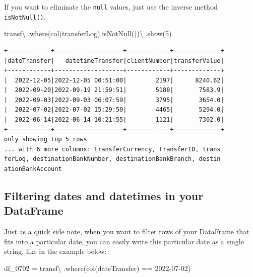 \documentclass[
  11pt,
  letterpaper,
  DIV=11,
  numbers=noendperiod]{scrreprt}
\newenvironment{Shaded}{\begin{snugshade}}{\end{snugshade}}
\newcommand{\DecValTok}[1]{\textcolor[rgb]{0.68,0.00,0.00}{#1}}
\newcommand{\NormalTok}[1]{\textcolor[rgb]{0.00,0.23,0.31}{#1}}
\newcommand{\OperatorTok}[1]{\textcolor[rgb]{0.37,0.37,0.37}{#1}}
\newcommand{\StringTok}[1]{\textcolor[rgb]{0.13,0.47,0.30}{#1}}
\begin{document}
If you want to eliminate the \texttt{null} values, just use the inverse
method \texttt{isNotNull()}.

\begin{Shaded}
\begin{Highlighting}[]
\NormalTok{transf}\OperatorTok{\textbackslash{}}
\NormalTok{  .where(col(}\StringTok{\textquotesingle{}transferLog\textquotesingle{}}\NormalTok{).isNotNull())}\OperatorTok{\textbackslash{}}
\NormalTok{  .show(}\DecValTok{5}\NormalTok{)}
\end{Highlighting}
\end{Shaded}

\begin{verbatim}
+------------+-------------------+------------+-------------+
|dateTransfer|   datetimeTransfer|clientNumber|transferValue|
+------------+-------------------+------------+-------------+
|  2022-12-05|2022-12-05 00:51:00|        2197|      8240.62|
|  2022-09-20|2022-09-19 21:59:51|        5188|       7583.9|
|  2022-09-03|2022-09-03 06:07:59|        3795|       3654.0|
|  2022-07-02|2022-07-02 15:29:50|        4465|       5294.0|
|  2022-06-14|2022-06-14 10:21:55|        1121|       7302.0|
+------------+-------------------+------------+-------------+
only showing top 5 rows
... with 6 more columns: transferCurrency, transferID, trans
ferLog, destinationBankNumber, destinationBankBranch, destin
ationBankAccount
\end{verbatim}

\subsection{Filtering dates and datetimes in your
DataFrame}\label{filtering-dates-and-datetimes-in-your-dataframe}

Just as a quick side note, when you want to filter rows of your
DataFrame that fits into a particular date, you can easily write this
particular date as a single string, like in the example below:

\begin{Shaded}
\begin{Highlighting}[]
\NormalTok{df\_0702 }\OperatorTok{=}\NormalTok{ transf}\OperatorTok{\textbackslash{}}
\NormalTok{  .where(col(}\StringTok{\textquotesingle{}dateTransfer\textquotesingle{}}\NormalTok{) }\OperatorTok{==} \StringTok{\textquotesingle{}2022{-}07{-}02\textquotesingle{}}\NormalTok{)}
\end{Highlighting}
\end{Shaded}
\end{document}
